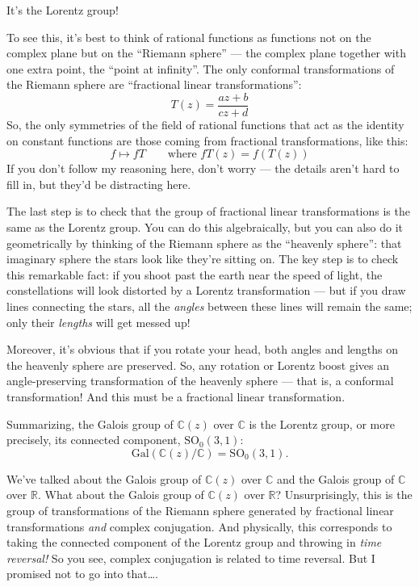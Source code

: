 \documentclass{article}
\begin{document}
It's the Lorentz group!

To see this, it's best to think of rational functions as functions not
on the complex plane but on the ``Riemann sphere'' --- the complex plane
together with one extra point, the ``point at infinity''. The only
conformal transformations of the Riemann sphere are ``fractional linear
transformations'': \[T(z) = \frac{az+b}{cz+d}\] So, the only symmetries
of the field of rational functions that act as the identity on constant
functions are those coming from fractional transformations, like this:
\[f \mapsto fT \qquad \mbox{where $fT(z) = f(T(z))$}\] If you don't
follow my reasoning here, don't worry --- the details aren't hard to
fill in, but they'd be distracting here.

The last step is to check that the group of fractional linear
transformations is the same as the Lorentz group. You can do this
algebraically, but you can also do it geometrically by thinking of the
Riemann sphere as the ``heavenly sphere'': that imaginary sphere the
stars look like they're sitting on. The key step is to check this
remarkable fact: if you shoot past the earth near the speed of light,
the constellations will look distorted by a Lorentz transformation ---
but if you draw lines connecting the stars, all the \emph{angles}
between these lines will remain the same; only their \emph{lengths} will
get messed up!

Moreover, it's obvious that if you rotate your head, both angles and
lengths on the heavenly sphere are preserved. So, any rotation or
Lorentz boost gives an angle-preserving transformation of the heavenly
sphere --- that is, a conformal transformation! And this must be a
fractional linear transformation.

Summarizing, the Galois group of \(\mathbb{C}(z)\) over \(\mathbb{C}\)
is the Lorentz group, or more precisely, its connected component,
\(\mathrm{SO}_0(3,1)\):
\[\mathrm{Gal}(\mathbb{C}(z)/\mathbb{C}) = \mathrm{SO}_0(3,1).\]

We've talked about the Galois group of \(\mathbb{C}(z)\) over
\(\mathbb{C}\) and the Galois group of \(\mathbb{C}\) over
\(\mathbb{R}\). What about the Galois group of \(\mathbb{C}(z)\) over
\(\mathbb{R}\)? Unsurprisingly, this is the group of transformations of
the Riemann sphere generated by fractional linear transformations
\emph{and} complex conjugation. And physically, this corresponds to
taking the connected component of the Lorentz group and throwing in
\emph{time reversal!} So you see, complex conjugation is related to time
reversal. But I promised not to go into that\ldots.
\end{document}
